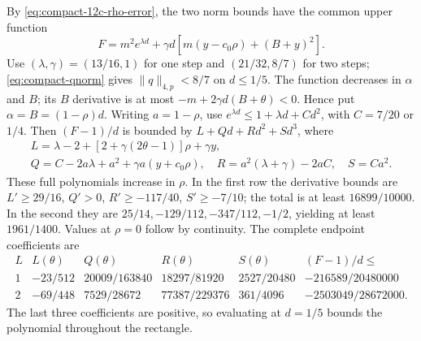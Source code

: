 By \eqref{eq:compact-12c-rho-error}, the two norm bounds have the common
upper function
\[
 F=m^2e^{\lambda d}+\gamma d[m(y-c_0\rho)+(B+y)^2].
\]
Use $(\lambda,\gamma)=(13/16,1)$ for one step and $(21/32,8/7)$ for two
steps; \eqref{eq:compact-qnorm} gives $\|q\|_{4,p}<8/7$ on $d\le1/5$.
The function decreases in $\alpha$ and $B$; its $B$ derivative is at most
$-m+2\gamma d(B+\theta)<0$. Hence put $\alpha=B=(1-\rho)d$.
Writing $a=1-\rho$, use
$e^{\lambda d}\le1+\lambda d+Cd^2$, with $C=7/20$ or $1/4$.
Then $(F-1)/d$ is bounded by $L+Qd+Rd^2+Sd^3$, where
\begin{gather*}
 L=\lambda-2+[2+\gamma(2\theta-1)]\rho+\gamma y,\\
 Q=C-2a\lambda+a^2+\gamma a(y+c_0\rho),\quad
 R=a^2(\lambda+\gamma)-2aC,\quad S=Ca^2.
\end{gather*}
These full polynomials increase in $\rho$. In the first row the derivative
bounds are $L'\ge29/16$, $Q'>0$, $R'\ge-117/40$, $S'\ge-7/10$;
the total is at least $16899/10000$.
In the second they are $25/14,-129/112,-347/112,-1/2$, yielding
at least $1961/1400$. Values at $\rho=0$ follow by continuity.
The complete endpoint coefficients are
\[
 \begin{array}{c|cccc|c}
 L&L(\theta)&Q(\theta)&R(\theta)&S(\theta)&(F-1)/d\le\\\hline
 1&-23/512&20009/163840&18297/81920&2527/20480&-216589/20480000\\
 2&-69/448&7529/28672&77387/229376&361/4096&-2503049/28672000.
 \end{array}
\]
The last three coefficients are positive, so evaluating at $d=1/5$
bounds the polynomial throughout the rectangle.

